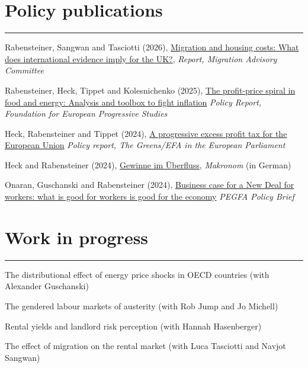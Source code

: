 \documentclass[letterpaper]{article}
\renewenvironment{itemize}{
  \begin{list}{}
    { \setlength{\itemsep}{5pt}
      \setlength{\parsep}{0pt}
      \setlength{\topsep}{0pt}
      \setlength{\leftmargin}{0em} } }{
  \end{list}}
\begin{document}
\section*{Policy publications}
\hrule
\begin{itemize}
    \item Rabensteiner, Sangwan and Tasciotti (2026), \href{https://www.gov.uk/government/publications/migration-and-housing-costs-what-does-international-evidence-imply-for-the-uk}{Migration and housing costs: What does international evidence imply for the UK?}, \textit{Report, Migration Advisory Committee}
    \item Rabensteiner, Heck, Tippet and Kolesnichenko (2025), \href{https://gala.gre.ac.uk/id/eprint/50213/8/50213%20RABENSTEINER_The_Profit-price_Spiral_In_Food_And_Energy_%28VoR%29_2025.pdf}{The profit-price spiral in food and energy: Analysis and toolbox to fight inflation} \textit{Policy Report, Foundation for European Progressive Studies}
    \item Heck, Rabensteiner and Tippet (2024), \href{https://gala.gre.ac.uk/id/eprint/45941/7/45941_TIPPET_A_progressive%20_excess_profit_tax_for_the_European_Union.pdf}{A progressive excess profit tax for the European Union} \textit{Policy report, The Greens/EFA in the European Parliament}    %
    \item Heck and Rabensteiner (2024), \href{https://makronom.de/gewinne-im-ueberfluss-wer-profitiert-von-den-krisen-47654}{Gewinne im Überfluss}, \textit{Makronom} (in German)
    \item Onaran, Guschanski and Rabensteiner (2024), \href{https://gala.gre.ac.uk/id/eprint/47309/3/47309_ONARAN_Business_case_for_a_New_Deal_for_workers_What_is_good_for_workers_is_good_for_the_economy.pdf}{Business case for a New Deal for workers: what is good for workers is good for the economy} \textit{PEGFA Policy Brief}
\end{itemize}

\section*{Work in progress}
\hrule
\begin{itemize}
    \item The distributional effect of energy price shocks in OECD countries (with Alexander Guschanski)
    \item The gendered labour markets of austerity (with Rob Jump and Jo Michell) 
    \item Rental yields and landlord risk perception (with Hannah Hasenberger)
    \item The effect of migration on the rental market (with Luca Tasciotti and Navjot Sangwan)
\end{itemize}
\end{document}
